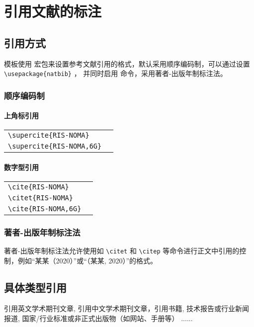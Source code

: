 
\chapter{引用文献的标注}


\section{引用方式}

模板使用  宏包来设置参考文献引用的格式，默认采用顺序编码制，可以通过设置 \verb|\usepackage{natbib}| ，
并同时启用 \verb|| 命令，采用著者-出版年制标注法。

\subsection{顺序编码制}

\subsubsection{上角标引用}

\noindent
\begin{tabular}{l@{\quad$\Rightarrow$\quad}l}
  \verb|\supercite{RIS-NOMA}|         & \supercite{RIS-NOMA}         \\
  \verb|\supercite{RIS-NOMA,6G}|    & \supercite{RIS-NOMA,6G}    \\
\end{tabular}


\subsubsection{数字型引用}

\noindent
\begin{tabular}{l@{\quad$\Rightarrow$\quad}l}
  \verb|\cite{RIS-NOMA}|         & \cite{RIS-NOMA}         \\
  \verb|\citet{RIS-NOMA}|        & \citet{RIS-NOMA}        \\
  \verb|\cite{RIS-NOMA,6G}|    & \cite{RIS-NOMA,6G}    \\
\end{tabular}



\subsection{著者-出版年制标注法}

著者-出版年制标注法允许使用如 \verb|\citet| 和 \verb|\citep| 等命令进行正文中引用的控制，例如“某某（2020）”或“（某某, 2020）”的格式。



\section{具体类型引用}

引用英文学术期刊文章\cite{6G}, 引用中文学术期刊文章\cite{DZYX20250507002}，引用书籍\cite{cho2010mimo}, 技术报告或行业新闻报道\cite{TXCY202504210030}, 国家/行业标准或非正式出版物（如网站、手册等） \cite{SCSF00088414}......



